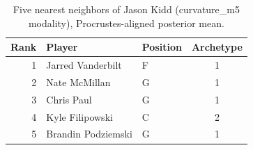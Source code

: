 \begin{table}[htbp]
  \centering\small
  \begin{tabular}{rllc}
    \toprule
    Rank & Player & Position & Archetype \\
    \midrule
    1 & Jarred Vanderbilt & F & 1 \\
    2 & Nate McMillan & G & 1 \\
    3 & Chris Paul & G & 1 \\
    4 & Kyle Filipowski & C & 2 \\
    5 & Brandin Podziemski & G & 1 \\
    \bottomrule
  \end{tabular}
  \caption{Five nearest neighbors of Jason Kidd (curvature_m5 modality), Procrustes-aligned posterior mean.}
  \label{tab:Jason_Kidd_neighbors_curvature_m5}
\end{table}

